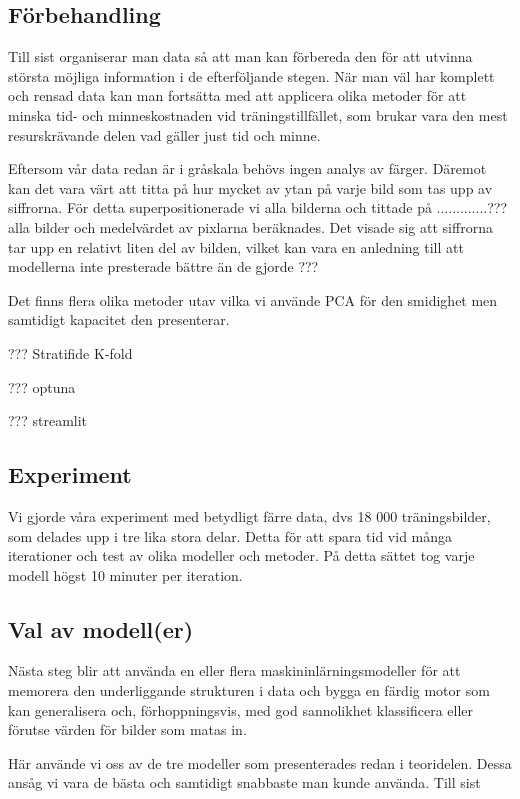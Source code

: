 \documentclass[12pt,a4paper]{article}
\begin{document}
\subsection{Förbehandling}

Till sist organiserar man data så att man kan förbereda den för att utvinna största möjliga information i de efterföljande stegen. När man väl har komplett och rensad data kan man fortsätta med att applicera olika metoder för att minska tid- och minneskostnaden vid träningstillfället, som brukar vara den mest resurskrävande delen vad gäller just tid och minne.

Eftersom vår data redan är i gråskala behövs ingen analys av färger. Däremot kan det vara värt att titta på hur mycket av ytan på varje bild som tas upp av siffrorna. För detta superpositionerade vi alla bilderna och tittade på .............??? alla bilder och medelvärdet av pixlarna beräknades. Det visade sig att siffrorna tar upp en relativt liten del av bilden, vilket kan vara en anledning till att modellerna inte presterade bättre än de gjorde ???

Det finns flera olika metoder utav vilka vi använde PCA för den smidighet men samtidigt kapacitet den presenterar.

??? Stratifide K-fold

??? optuna

??? streamlit

\subsection{Experiment}

Vi gjorde våra experiment med betydligt färre data, dvs 18 000 träningsbilder, som delades upp i tre lika stora delar. Detta för att spara tid vid många iterationer och test av olika modeller och metoder. På detta sättet tog varje modell högst 10 minuter per iteration. 

\subsection{Val av modell(er)}

Nästa steg blir att använda en eller flera maskininlärningsmodeller för att memorera den underliggande strukturen i data och bygga en färdig motor som kan generalisera och, förhoppningsvis, med god sannolikhet klassificera eller förutse värden för bilder som matas in.

Här använde vi oss av de tre modeller som presenterades redan i teoridelen. Dessa ansåg vi vara de bästa och samtidigt snabbaste man kunde använda. Till sist 
\end{document}
